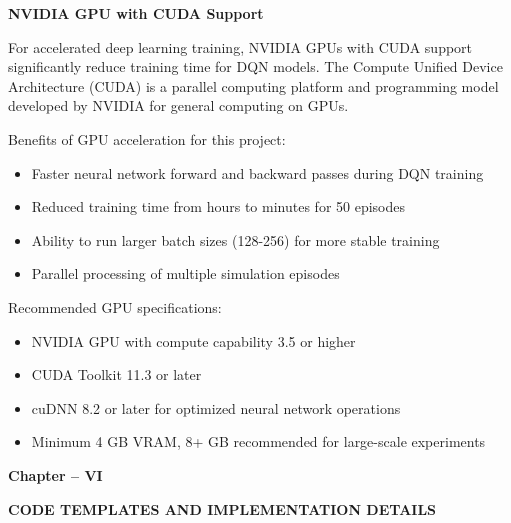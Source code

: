 \documentclass[12pt,a4paper]{article}
\begin{document}
\textbf{NVIDIA GPU with CUDA Support}

For accelerated deep learning training, NVIDIA GPUs with CUDA support significantly reduce training time for DQN models. The Compute Unified Device Architecture (CUDA) is a parallel computing platform and programming model developed by NVIDIA for general computing on GPUs.

Benefits of GPU acceleration for this project:

\begin{itemize}
    \item Faster neural network forward and backward passes during DQN training
    \item Reduced training time from hours to minutes for 50 episodes
    \item Ability to run larger batch sizes (128-256) for more stable training
    \item Parallel processing of multiple simulation episodes
\end{itemize}

Recommended GPU specifications:

\begin{itemize}
    \item NVIDIA GPU with compute capability 3.5 or higher
    \item CUDA Toolkit 11.3 or later
    \item cuDNN 8.2 or later for optimized neural network operations
    \item Minimum 4 GB VRAM, 8+ GB recommended for large-scale experiments
\end{itemize}


\thispagestyle{plain}


\clearpage

\begin{center}
    \vspace*{10cm}
    
    {\fontsize{16}{19.2}\selectfont\bfseries
    Chapter -- VI}
    
    \vspace{1cm}
    
    {\fontsize{16}{19.2}\selectfont\bfseries
    CODE TEMPLATES AND IMPLEMENTATION DETAILS}
    
    \vspace*{\fill}
\end{center}
\end{document}
